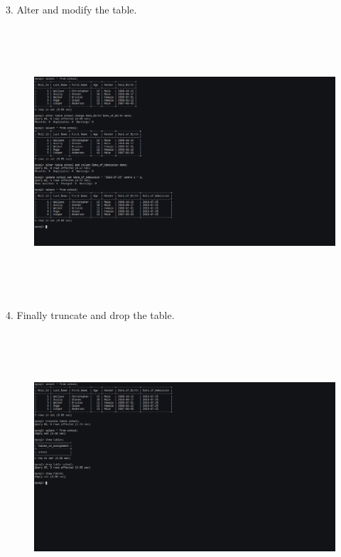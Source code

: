 \documentclass[a4paper,11pt,openright]{report}
\begin{document}
\pagebreak

\vspace{10px}

3. Alter and modify the table.

\begin{figure}[ht!]
\includegraphics[width=20cm,height=10cm,keepaspectratio]{solution3.png}
\centering
\end{figure}

\vspace{20px}

4. Finally truncate and drop the table.

\begin{figure}[ht!]
\includegraphics[width=20cm,height=10cm,keepaspectratio]{solution4.png}
\centering
\end{figure}
\end{document}
